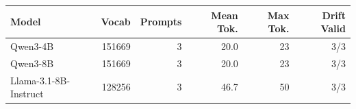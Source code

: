 \begin{tabular}{lrrrrr}
\toprule
Model & Vocab & Prompts & Mean Tok. & Max Tok. & Drift Valid \\
\midrule
Qwen3-4B & 151669 & 3 & 20.0 & 23 & 3/3 \\
Qwen3-8B & 151669 & 3 & 20.0 & 23 & 3/3 \\
Llama-3.1-8B-Instruct & 128256 & 3 & 46.7 & 50 & 3/3 \\
\bottomrule
\end{tabular}
